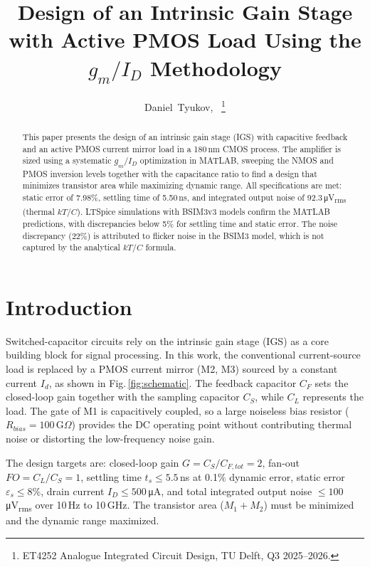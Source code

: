 \documentclass[journal]{IEEEtran}
\begin{document}
\title{Design of an Intrinsic Gain Stage with Active PMOS Load Using the $g_m/I_D$ Methodology}

\author{Daniel~Tyukov,~
\thanks{ET4252 Analogue Integrated Circuit Design, TU Delft, Q3 2025--2026.}}

\maketitle

\begin{abstract}
This paper presents the design of an intrinsic gain stage (IGS) with capacitive feedback and an active PMOS current mirror load in a 180\,nm CMOS process. The amplifier is sized using a systematic $g_m/I_D$ optimization in MATLAB, sweeping the NMOS and PMOS inversion levels together with the capacitance ratio to find a design that minimizes transistor area while maximizing dynamic range. All specifications are met: static error of 7.98\%, settling time of 5.50\,ns, and integrated output noise of 92.3\,\si{\micro V_{rms}} (thermal $kT/C$). LTSpice simulations with BSIM3v3 models confirm the MATLAB predictions, with discrepancies below 5\% for settling time and static error. The noise discrepancy (22\%) is attributed to flicker noise in the BSIM3 model, which is not captured by the analytical $kT/C$ formula.
\end{abstract}

\section{Introduction}

Switched-capacitor circuits rely on the intrinsic gain stage (IGS) as a core building block for signal processing. In this work, the conventional current-source load is replaced by a PMOS current mirror (M2, M3) sourced by a constant current $I_d$, as shown in Fig.\,\ref{fig:schematic}. The feedback capacitor $C_F$ sets the closed-loop gain together with the sampling capacitor $C_S$, while $C_L$ represents the load. The gate of M1 is capacitively coupled, so a large noiseless bias resistor ($R_{bias} = 100$\,G$\Omega$) provides the DC operating point without contributing thermal noise or distorting the low-frequency noise gain.

The design targets are: closed-loop gain $G = C_S/C_{F,tot} = 2$, fan-out $FO = C_L/C_S = 1$, settling time $t_s \leq 5.5$\,ns at 0.1\% dynamic error, static error $\varepsilon_s \leq 8$\%, drain current $I_D \leq 500$\,\si{\micro A}, and total integrated output noise $\leq 100$\,\si{\micro V_{rms}} over 10\,Hz to 10\,GHz. The transistor area ($M_1 + M_2$) must be minimized and the dynamic range maximized.
\end{document}
